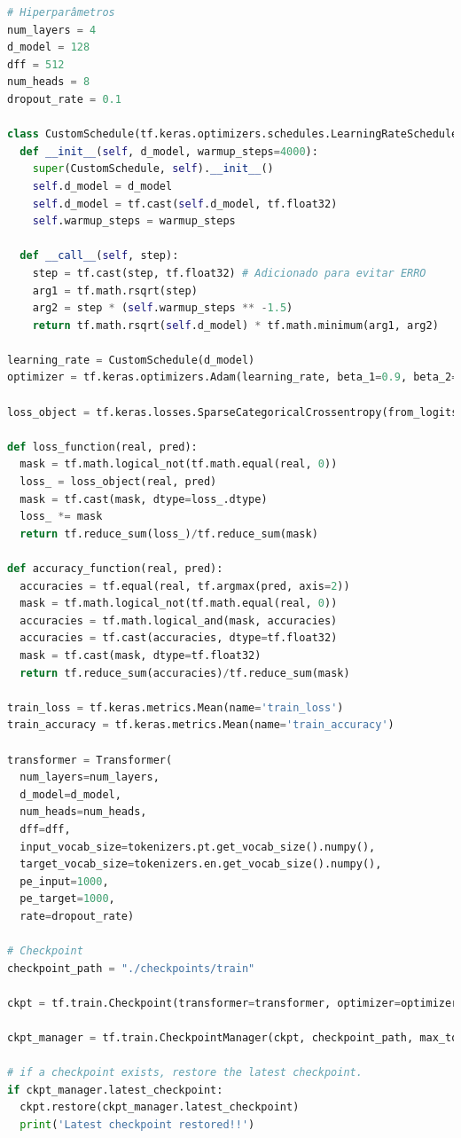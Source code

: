 \begin{lstlisting}[language=Python, style=input]
# Hiperparâmetros
num_layers = 4
d_model = 128
dff = 512
num_heads = 8
dropout_rate = 0.1

class CustomSchedule(tf.keras.optimizers.schedules.LearningRateSchedule):
  def __init__(self, d_model, warmup_steps=4000):
    super(CustomSchedule, self).__init__()
    self.d_model = d_model
    self.d_model = tf.cast(self.d_model, tf.float32)
    self.warmup_steps = warmup_steps

  def __call__(self, step):
    step = tf.cast(step, tf.float32) # Adicionado para evitar ERRO
    arg1 = tf.math.rsqrt(step)
    arg2 = step * (self.warmup_steps ** -1.5)
    return tf.math.rsqrt(self.d_model) * tf.math.minimum(arg1, arg2)

learning_rate = CustomSchedule(d_model)
optimizer = tf.keras.optimizers.Adam(learning_rate, beta_1=0.9, beta_2=0.98, epsilon=1e-9)

loss_object = tf.keras.losses.SparseCategoricalCrossentropy(from_logits=True, reduction='none')

def loss_function(real, pred):
  mask = tf.math.logical_not(tf.math.equal(real, 0))
  loss_ = loss_object(real, pred)
  mask = tf.cast(mask, dtype=loss_.dtype)
  loss_ *= mask
  return tf.reduce_sum(loss_)/tf.reduce_sum(mask)

def accuracy_function(real, pred):
  accuracies = tf.equal(real, tf.argmax(pred, axis=2))
  mask = tf.math.logical_not(tf.math.equal(real, 0))
  accuracies = tf.math.logical_and(mask, accuracies)
  accuracies = tf.cast(accuracies, dtype=tf.float32)
  mask = tf.cast(mask, dtype=tf.float32)
  return tf.reduce_sum(accuracies)/tf.reduce_sum(mask)

train_loss = tf.keras.metrics.Mean(name='train_loss')
train_accuracy = tf.keras.metrics.Mean(name='train_accuracy')

transformer = Transformer(
  num_layers=num_layers,
  d_model=d_model,
  num_heads=num_heads,
  dff=dff,
  input_vocab_size=tokenizers.pt.get_vocab_size().numpy(),
  target_vocab_size=tokenizers.en.get_vocab_size().numpy(),
  pe_input=1000,
  pe_target=1000,
  rate=dropout_rate)

# Checkpoint
checkpoint_path = "./checkpoints/train"

ckpt = tf.train.Checkpoint(transformer=transformer, optimizer=optimizer)

ckpt_manager = tf.train.CheckpointManager(ckpt, checkpoint_path, max_to_keep=5)

# if a checkpoint exists, restore the latest checkpoint.
if ckpt_manager.latest_checkpoint:
  ckpt.restore(ckpt_manager.latest_checkpoint)
  print('Latest checkpoint restored!!')


\end{lstlisting}
